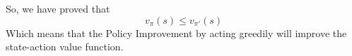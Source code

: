 \begin{homeworkProblem}
So, we have proved that
$$v_{\pi}(s) \leq v_{\pi'}(s)$$
Which means that the Policy Improvement by acting greedily will improve the state-action value function.

\end{homeworkProblem}

\newpage